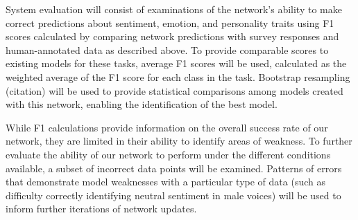 System evaluation will consist of examinations of the network's ability to
make correct predictions about sentiment, emotion, and personality traits
using F1 scores calculated by comparing network predictions with survey
responses and human-annotated data as described above. To provide comparable
scores to existing models for these tasks, average F1 scores will be used,
calculated as the weighted average of the F1 score for each class in the task.
Bootstrap resampling (citation) will be used to provide statistical
comparisons among models created with this network, enabling the
identification of the best model. 

While F1 calculations provide information on the overall success rate of our
network, they are limited in their ability to identify areas of weakness. To
further evaluate the ability of our network to perform under the different
conditions available, a subset of incorrect data points will be examined.
Patterns of errors that demonstrate model weaknesses with a particular type of
data (such as difficulty correctly identifying neutral sentiment in male
voices) will be used to inform further iterations of network updates. 
